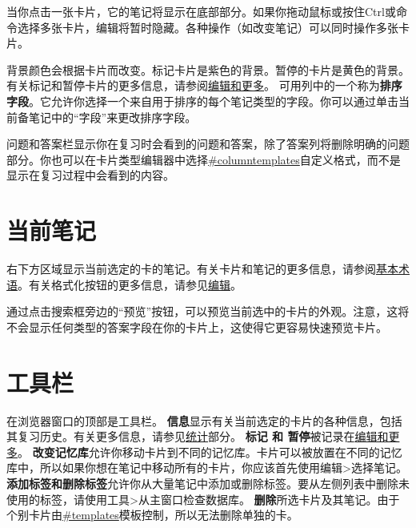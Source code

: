\documentclass[a4paper]{book}
\begin{document}
		当你点击一张卡片，它的笔记将显示在底部部分。如果你拖动鼠标或按住Ctrl或命令选择多张卡片，编辑将暂时隐藏。各种操作（如改变笔记）可以同时操作多张卡片。
		
		背景颜色会根据卡片而改变。标记卡片是紫色的背景。暂停的卡片是黄色的背景。有关标记和暂停卡片的更多信息，请参阅\hyperref[editmore]{编辑和更多}。
		可用列中的一个称为\textbf{排序字段}。它允许你选择一个来自用于排序的每个笔记类型的字段。你可以通过单击当前备笔记中的“字段”来更改排序字段。
		
		问题和答案栏显示你在复习时会看到的问题和答案，除了答案列将删除明确的问题部分。你也可以在卡片类型编辑器中选择\url{#columntemplates}自定义格式，而不是显示在复习过程中会看到的内容。
		
		\section{当前笔记}
		
		右下方区域显示当前选定的卡的笔记。有关卡片和笔记的更多信息，请参阅\hyperref[basics]{基本术语}。有关格式化按钮的更多信息，请参见\hyperref[editor]{编辑}。
		
		通过点击搜索框旁边的“预览”按钮，可以预览当前选中的卡片的外观。注意，这将不会显示任何类型的答案字段在你的卡片上，这使得它更容易快速预览卡片。
		\section{工具栏}
		在浏览器窗口的顶部是工具栏。
		\textbf{信息}显示有关当前选定的卡片的各种信息，包括其复习历史。有关更多信息，请参见\hyperref[stats]{统计}部分。
		\textbf{标记 和 暂停}被记录在\hyperref[editmore]{编辑和更多}。
		\textbf{改变记忆库}允许你移动卡片到不同的记忆库。卡片可以被放置在不同的记忆库中，所以如果你想在笔记中移动所有的卡片，你应该首先使用编辑>选择笔记。
		\textbf{添加标签和删除标签}允许你从大量笔记中添加或删除标签。要从左侧列表中删除未使用的标签，请使用工具>从主窗口检查数据库。
		\textbf{删除}所选卡片及其笔记。由于个别卡片由\url{#templates}模板控制，所以无法删除单独的卡。
\end{document}
